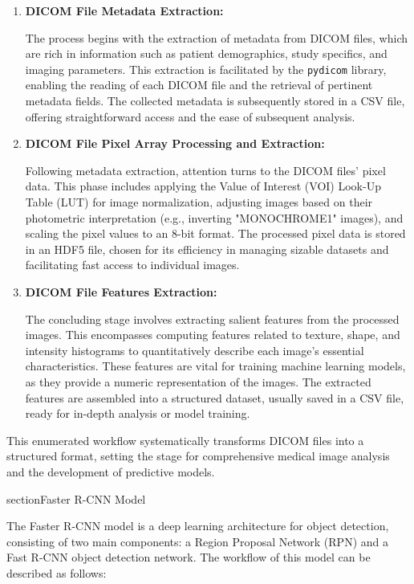 \documentclass[12pt,oneside]{book} %
\begin{document}
\begin{enumerate}
    \item \textbf{DICOM File Metadata Extraction:}

          The process begins with the extraction of metadata from DICOM files, which are
          rich in information such as patient demographics, study specifics, and imaging
          parameters. This extraction is facilitated by the \texttt{pydicom} library,
          enabling the reading of each DICOM file and the retrieval of pertinent metadata
          fields. The collected metadata is subsequently stored in a CSV file, offering
          straightforward access and the ease of subsequent analysis.

    \item \textbf{DICOM File Pixel Array Processing and Extraction:}

          Following metadata extraction, attention turns to the DICOM files' pixel data.
          This phase includes applying the Value of Interest (VOI) Look-Up Table (LUT)
          for image normalization, adjusting images based on their photometric
          interpretation (e.g., inverting "MONOCHROME1" images), and scaling the pixel
          values to an 8-bit format. The processed pixel data is stored in an HDF5 file,
          chosen for its efficiency in managing sizable datasets and facilitating fast
          access to individual images.

    \item \textbf{DICOM File Features Extraction:}

          The concluding stage involves extracting salient features from the processed
          images. This encompasses computing features related to texture, shape, and
          intensity histograms to quantitatively describe each image's essential
          characteristics. These features are vital for training machine learning models,
          as they provide a numeric representation of the images. The extracted features
          are assembled into a structured dataset, usually saved in a CSV file, ready for
          in-depth analysis or model training.
\end{enumerate}

This enumerated workflow systematically transforms DICOM files into a
structured format, setting the stage for comprehensive medical image analysis
and the development of predictive models.

section{Faster R-CNN Model}

The Faster R-CNN model is a deep learning architecture for object detection,
consisting of two main components: a Region Proposal Network (RPN) and a Fast
R-CNN object detection network. The workflow of this model can be described as
follows:
\end{document}
